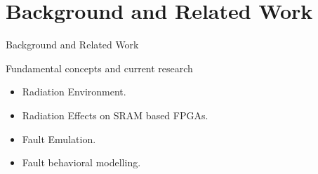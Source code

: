 \documentclass[aspectratio=1610]{beamer}
\begin{document}
\section{Background and Related Work}

\begin{frame}{Background and Related Work}
\vspace{-2.5cm}
\begin{block}{Fundamental concepts and current research}

\end{block}
\begin{itemize}

\item Radiation Environment.
\item Radiation Effects on SRAM based FPGAs.
\item Fault Emulation.
\item Fault behavioral modelling.
\end{itemize}



\end{frame}
\end{document}
